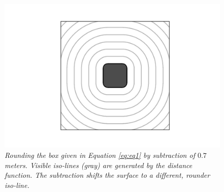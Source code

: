 \documentclass[twoside,a4paper]{article}
\begin{document}
\begin{figure}[ht]
\centerline{\includegraphics[scale=0.6]{img/sdf2dbox.png}}
\caption{\label{sdf_2d_box}{\it Rounding the box given in Equation \ref{eq:eq1} by subtraction of $0.7$meters. Visible iso-lines (gray) are generated by the distance function. The subtraction shifts the surface to a different, rounder iso-line.}}
\end{figure}  
\end{document}
